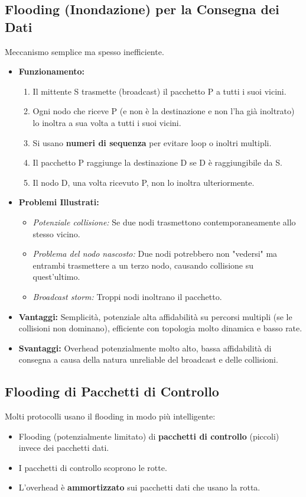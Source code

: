 \subsection{Flooding (Inondazione) per la Consegna dei Dati}
Meccanismo semplice ma spesso inefficiente.
\begin{itemize}
    \item \textbf{Funzionamento:}
    \begin{enumerate}
        \item Il mittente S trasmette (broadcast) il pacchetto P a tutti i suoi vicini.
        \item Ogni nodo che riceve P (e non è la destinazione e non l'ha già inoltrato) lo inoltra a sua volta a tutti i suoi vicini.
        \item Si usano \textbf{numeri di sequenza} per evitare loop o inoltri multipli.
        \item Il pacchetto P raggiunge la destinazione D se D è raggiungibile da S.
        \item Il nodo D, una volta ricevuto P, non lo inoltra ulteriormente.
    \end{enumerate}
    \item \textbf{Problemi Illustrati:}
    \begin{itemize}
        \item \textit{Potenziale collisione:} Se due nodi trasmettono contemporaneamente allo stesso vicino.
        \item \textit{Problema del nodo nascosto:} Due nodi potrebbero non "vedersi" ma entrambi trasmettere a un terzo nodo, causando collisione su quest'ultimo.
        \item \textit{Broadcast storm:} Troppi nodi inoltrano il pacchetto.
    \end{itemize}
    \item \textbf{Vantaggi:} Semplicità, potenziale alta affidabilità su percorsi multipli (se le collisioni non dominano), efficiente con topologia molto dinamica e basso rate.
    \item \textbf{Svantaggi:} Overhead potenzialmente molto alto, bassa affidabilità di consegna a causa della natura unreliable del broadcast e delle collisioni.
\end{itemize}

\subsection{Flooding di Pacchetti di Controllo}
Molti protocolli usano il flooding in modo più intelligente:
\begin{itemize}
    \item Flooding (potenzialmente limitato) di \textbf{pacchetti di controllo} (piccoli) invece dei pacchetti dati.
    \item I pacchetti di controllo scoprono le rotte.
    \item L'overhead è \textbf{ammortizzato} sui pacchetti dati che usano la rotta.
\end{itemize}

